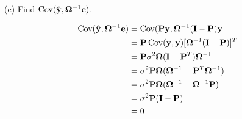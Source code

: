 \bigskip
\noindent
(e) Find $\mathop{\rm Cov}(\mathbf{\hat y},\bm\Omega^{-1}\mathbf e)$.

\bigskip
\noindent
\begin{align*}
\mathop{\rm Cov}(\mathbf{\hat y},\bm\Omega^{-1}\mathbf e)
&=\mathop{\rm Cov}(\mathbf{Py},\bm\Omega^{-1}(\mathbf I
-\mathbf P)\mathbf y\\
&=\mathbf P\mathop{\rm Cov}(\mathbf y,\mathbf y)
[\bm\Omega^{-1}(\mathbf I-\mathbf P)]^T\\
&=\mathbf P\sigma^2\bm\Omega(\mathbf I-\mathbf P^T)\bm\Omega^{-1}\\
&=\sigma^2\mathbf P\bm\Omega(\bm\Omega^{-1}-\mathbf P^T\bm\Omega^{-1})\\
&=\sigma^2\mathbf P\bm\Omega(\bm\Omega^{-1}-\bm\Omega^{-1}\mathbf P)\\
&=\sigma^2\mathbf P(\mathbf I-\mathbf P)\\
&=0
\end{align*}

